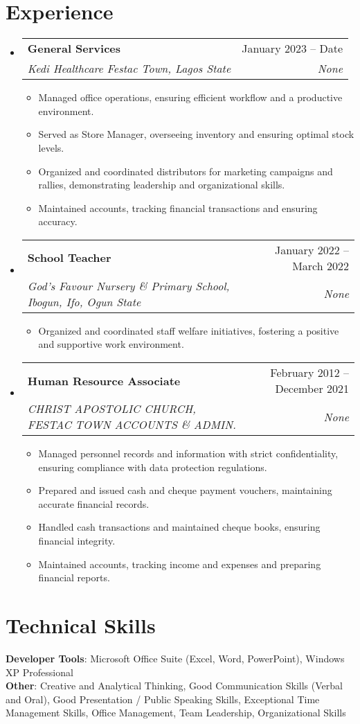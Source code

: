 \documentclass[letterpaper,11pt]{article}
\makeatletter
\newcommand{\resumeItem}[1]{
  \item\small{
    {#1 \vspace{-2pt}}
  }
}
\newcommand{\resumeSubheading}[4]{
  \vspace{-2pt}\item
    \begin{tabular*}{0.97\textwidth}[t]{l@{\extracolsep{\fill}}r}
      \textbf{#1} & #2 \\
      \textit{\small#3} & \textit{\small #4} \\
    \end{tabular*}\vspace{-7pt}
}
\newcommand{\resumeSubHeadingListStart}{\begin{itemize}[leftmargin=0.15in, label={}]}
\newcommand{\resumeSubHeadingListEnd}{\end{itemize}}
\newcommand{\resumeItemListStart}{\begin{itemize}}
\newcommand{\resumeItemListEnd}{\end{itemize}\vspace{-5pt}}
\makeatother
\begin{document}
\section{Experience}
  \resumeSubHeadingListStart
    \resumeSubheading
      {General Services}{January 2023 -- Date}
      {Kedi Healthcare Festac Town, Lagos State}{None}
      \resumeItemListStart
        \resumeItem{Managed office operations, ensuring efficient workflow and a productive environment.}
        \resumeItem{Served as Store Manager, overseeing inventory and ensuring optimal stock levels.}
        \resumeItem{Organized and coordinated distributors for marketing campaigns and rallies, demonstrating leadership and organizational skills.}
        \resumeItem{Maintained accounts, tracking financial transactions and ensuring accuracy.}
      \resumeItemListEnd
    \resumeSubheading
      {School Teacher}{January 2022 -- March 2022}
      {God’s Favour Nursery \& Primary School, Ibogun, Ifo, Ogun State}{None}
      \resumeItemListStart
        \resumeItem{Organized and coordinated staff welfare initiatives, fostering a positive and supportive work environment.}
      \resumeItemListEnd
    \resumeSubheading
      {Human Resource Associate}{February  2012 -- December 2021}
      {CHRIST APOSTOLIC CHURCH, FESTAC TOWN ACCOUNTS \& ADMIN.}{None}
      \resumeItemListStart
        \resumeItem{Managed personnel records and information with strict confidentiality, ensuring compliance with data protection regulations.}
        \resumeItem{Prepared and issued cash and cheque payment vouchers, maintaining accurate financial records.}
        \resumeItem{Handled cash transactions and maintained cheque books, ensuring financial integrity.}
        \resumeItem{Maintained accounts, tracking income and expenses and preparing financial reports.}
      \resumeItemListEnd
  \resumeSubHeadingListEnd

\section{Technical Skills}
 \begin{itemize}[leftmargin=0.15in, label={}]
    \small{\item{
     \textbf{Developer Tools}: Microsoft Office Suite (Excel, Word, PowerPoint), Windows XP Professional \\
     \textbf{Other}: Creative and Analytical Thinking, Good Communication Skills (Verbal and Oral), Good Presentation / Public Speaking Skills, Exceptional Time Management Skills, Office Management, Team Leadership, Organizational Skills
    }}
 \end{itemize}

\end{document}
